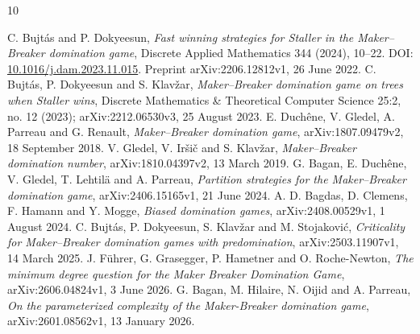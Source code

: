 \documentclass[11pt]{article}
\begin{document}
\begin{thebibliography}{10}\raggedright
{} C. Bujt\'as and P. Dokyeesun, \emph{Fast winning strategies for Staller in the Maker--Breaker domination game}, Discrete Applied Mathematics 344 (2024), 10--22. DOI: \href{https://doi.org/10.1016/j.dam.2023.11.015}{10.1016/j.dam.2023.11.015}. Preprint arXiv:2206.12812v1, 26 June 2022.
 C. Bujt\'as, P. Dokyeesun and S. Klav\v zar, \emph{Maker--Breaker domination game on trees when Staller wins}, Discrete Mathematics \& Theoretical Computer Science 25:2, no. 12 (2023); arXiv:2212.06530v3, 25 August 2023.
 E. Duch\^ene, V. Gledel, A. Parreau and G. Renault, \emph{Maker--Breaker domination game}, arXiv:1807.09479v2, 18 September 2018.
 V. Gledel, V. Ir\v si\v c and S. Klav\v zar, \emph{Maker--Breaker domination number}, arXiv:1810.04397v2, 13 March 2019.
 G. Bagan, E. Duch\^ene, V. Gledel, T. Lehtil\"a and A. Parreau, \emph{Partition strategies for the Maker--Breaker domination game}, arXiv:2406.15165v1, 21 June 2024.
 A. D. Bagdas, D. Clemens, F. Hamann and Y. Mogge, \emph{Biased domination games}, arXiv:2408.00529v1, 1 August 2024.
 C. Bujt\'as, P. Dokyeesun, S. Klav\v zar and M. Stojakovi\'c, \emph{Criticality for Maker--Breaker domination games with predomination}, arXiv:2503.11907v1, 14 March 2025.
 J. F\"uhrer, G. Grasegger, P. Hametner and O. Roche-Newton, \emph{The minimum degree question for the Maker Breaker Domination Game}, arXiv:2606.04824v1, 3 June 2026.
 G. Bagan, M. Hilaire, N. Oijid and A. Parreau, \emph{On the parameterized complexity of the Maker-Breaker domination game}, arXiv:2601.08562v1, 13 January 2026.
\end{thebibliography}
\end{document}
